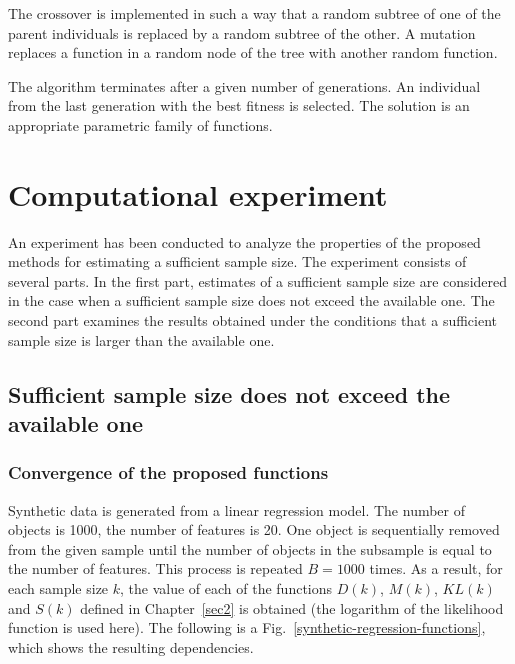 \documentclass[
11pt,%
tightenlines,%
twoside,%
onecolumn,%
nofloats,%
nobibnotes,%
nofootinbib,%
superscriptaddress,%
noshowpacs,%
centertags]%
{revtex4-2}
\begin{document}
The crossover is implemented in such a way that a random subtree of one of the parent individuals is replaced by a random subtree of the other. A mutation replaces a function in a random node of the tree with another random function. 

The algorithm terminates after a given number of generations. An individual from the last generation with the best fitness is selected. The solution is an appropriate parametric family of functions.

\section{Computational experiment}\label{sec4}

An experiment has been conducted to analyze the properties of the proposed methods for estimating a sufficient sample size. The experiment consists of several parts. In the first part, estimates of a sufficient sample size are considered in the case when a sufficient sample size does not exceed the available one. The second part examines the results obtained under the conditions that a sufficient sample size is larger than the available one.

\subsection{Sufficient sample size does not exceed the available one}

\subsubsection{Convergence of the proposed functions}

Synthetic data is generated from a linear regression model. The number of objects is 1000, the number of features is 20. One object is sequentially removed from the given sample until the number of objects in the subsample is equal to the number of features. This process is repeated $B=1000$ times. As a result, for each sample size $k$, the value of each of the functions $D(k)$, $M(k)$, $KL(k)$ and $S(k)$ defined in Chapter~\ref{sec2} is obtained (the logarithm of the likelihood function is used here). The following is a Fig.~\ref{synthetic-regression-functions}, which shows the resulting dependencies.
\end{document}

